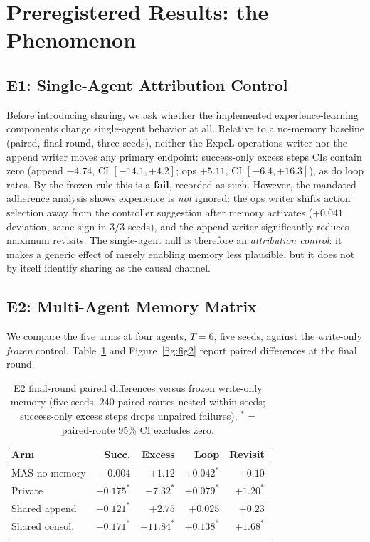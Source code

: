 \documentclass[letterpaper]{article} %
\begin{document}
\section{Preregistered Results: the Phenomenon}\label{sec:beta}

\subsection{E1: Single-Agent Attribution Control}

Before introducing sharing, we ask whether the implemented experience-learning components change single-agent
behavior at all. Relative to a no-memory baseline (paired, final round, three seeds), neither
the ExpeL-operations writer nor the append writer moves any primary endpoint: success-only
excess steps CIs contain zero (append $-4.74$, CI $[-14.1, +4.2]$; ops $+5.11$, CI
$[-6.4, +16.3]$), as do loop rates. By the frozen rule this is a \textbf{fail}, recorded as
such. However, the mandated adherence analysis shows experience is \emph{not} ignored: the
ops writer shifts action selection away from the controller suggestion after memory activates
($+0.041$ deviation, same sign in $3/3$ seeds), and the append writer significantly reduces
maximum revisits. The single-agent null is therefore an \emph{attribution control}: it makes a
generic effect of merely enabling memory less plausible, but it does not by itself identify
sharing as the causal channel.

\subsection{E2: Multi-Agent Memory Matrix}

We compare the five arms at four agents, $T{=}6$, five seeds, against the write-only
\emph{frozen} control. Table~\ref{tab:e2} and Figure~\ref{fig:fig2} report paired differences
at the final round.

\begin{table}[t]
\centering
\small
\caption{E2 final-round paired differences versus frozen write-only memory (five seeds,
240 paired routes nested within seeds; success-only excess steps drops unpaired failures).
$^\ast$ = paired-route 95\% CI excludes zero.}
\label{tab:e2}
\begin{tabular}{@{}lrrrr@{}}
\toprule
Arm & Succ. & Excess & Loop & Revisit \\
\midrule
MAS no memory  & $-0.004$      & $+1.12$        & $+0.042^\ast$ & $+0.10$ \\
Private        & $-0.175^\ast$ & $+7.32^\ast$   & $+0.079^\ast$ & $+1.20^\ast$ \\
Shared append  & $-0.121^\ast$ & $+2.75$        & $+0.025$      & $+0.23$ \\
Shared consol. & $-0.171^\ast$ & $+11.84^\ast$  & $+0.138^\ast$ & $+1.68^\ast$ \\
\bottomrule
\end{tabular}
\end{table}
\end{document}
